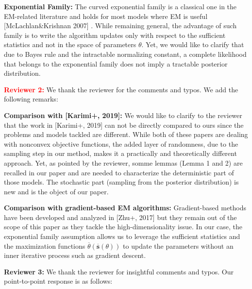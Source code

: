 \documentclass{article}
\begin{document}
\textbf{Exponential Family:} 
The curved exponential family is a classical one in the EM-related literature and holds for most models where  EM is useful [McLachlan\&Krishnan 2007] . 
While remaining general, the advantage of such family is to write the algorithm updates only with respect to the sufficient statistics and not in the space of parameters $\theta$. 
Yet, we would like to clarify that due to Bayes rule and the intractable normalizing constant, a complete likelihood that belongs to the exponential family does not imply a tractable posterior distribution.


\textbf{\textcolor{red}{Reviewer 2:}} We thank the reviewer for the comments and typos. We add the following remarks:

\textbf{Comparison with [Karimi+, 2019]:} 
We would like to clarify to the reviewer that the work in [Karimi+, 2019] can not be directly compared to ours since the problems and models tackled are different. 
While both of these papers are dealing with nonconvex objective functions, the added layer of randomness, due to the sampling step in our method, makes it a practically and theoretically different approach.
Yet, as pointed by the reviewer, somme lemmas (Lemma 1 and 2) are recalled in our paper and are needed to characterize the deterministic part of those models. The stochastic part (sampling from the posterior distribution) is new and is the object of our paper.

\textbf{Comparison with gradient-based EM algorithms:} 
Gradient-based methods have been developed and analyzed in [Zhu+, 2017] but they remain out of the scope of this paper as they tackle the high-dimensionality issue. 
In our case, the exponential family assumption allows us to leverage the sufficient statistics and the maximization functions $ \overline{\theta}( \overline{\textbf{s}}(\theta) )$ to update the parameters without an inner iterative process such as gradient descent.


\textbf{\textcolor{green!50!black}{Reviewer 3:}} We thank the reviewer for insightful comments and typos. Our point-to-point response is as follows:
\end{document}
